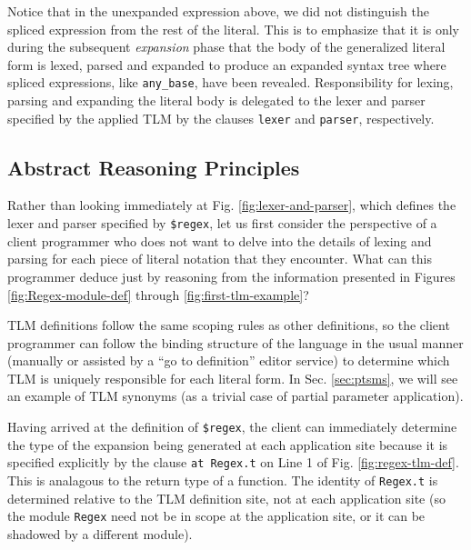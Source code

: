 \documentclass[acmsmall,review,anonymous]{acmart}\settopmatter{printfolios=true,printccs=false,printacmref=false}
\newcommand{\li}[1]{\lstinline[basicstyle=\ttfamily\fontsize{9pt}{1em}\selectfont]{#1}}
\begin{document}
Notice that in the unexpanded expression above, we did not distinguish the spliced expression from the rest of the literal. This is to emphasize that it is only during the subsequent \emph{expansion} phase that the body of the generalized literal form is lexed, parsed and expanded to produce an expanded syntax tree where spliced expressions, like \li{any_base}, have been revealed. Responsibility for lexing, parsing and expanding the literal body is delegated to the lexer and parser specified by the applied TLM by the clauses \li{lexer} and \li{parser}, respectively.

\vspace{-4px}
\subsection{Abstract Reasoning Principles} 
Rather than looking immediately at Fig. \ref{fig:lexer-and-parser}, which defines the lexer and parser specified by \li{$regex}, let us first consider the perspective of a client programmer who does not want to delve into the details of lexing and parsing for each piece of literal notation that they encounter. What can this programmer deduce just by reasoning from the information presented in Figures \ref{fig:Regex-module-def} through \ref{fig:first-tlm-example}? 

 TLM definitions follow the same scoping rules as other definitions, so the client programmer can follow the binding structure of the language in the usual manner (manually or assisted by a ``go to definition'' editor service) to determine which TLM is uniquely responsible for each literal form. In Sec. \ref{sec:ptsms}, we will see an example of TLM synonyms (as a trivial case of partial parameter application).

Having arrived at the definition of \li{$regex}, the client can immediately determine the type of the expansion being generated at each application site because it is specified explicitly by the clause \li{at Regex.t} on Line 1 of Fig. \ref{fig:regex-tlm-def}. This is analagous to the return type of a function. The identity of \li{Regex.t} is determined relative to the TLM definition site, not at each application site (so the module \li{Regex} need not be in scope at the application site, or it can be shadowed by a different module).
\end{document}
